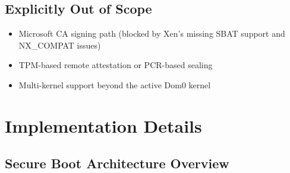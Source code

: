 \documentclass[12pt, a4paper]{article}
\begin{document}
\subsection*{Explicitly Out of Scope}
\begin{itemize}
    \item Microsoft CA signing path (blocked by Xen's missing SBAT support and NX\_COMPAT issues)
    \item TPM-based remote attestation or PCR-based sealing
    \item Multi-kernel support beyond the active Dom0 kernel
\end{itemize}

\section{Implementation Details}

\subsection{Secure Boot Architecture Overview}
\end{document}
